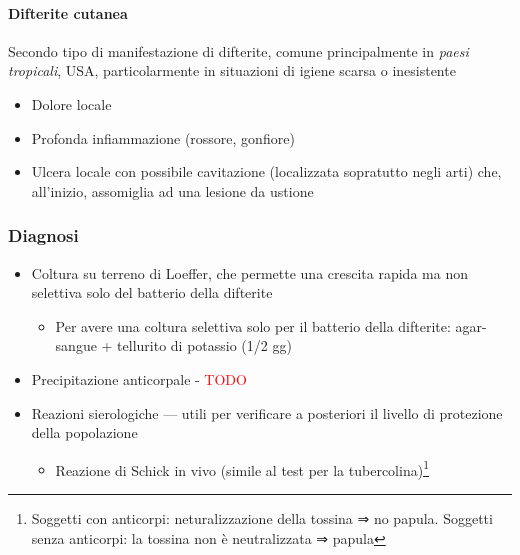 \documentclass[italian,]{article}
\providecommand{\tightlist}{%
  \setlength{\itemsep}{0pt}\setlength{\parskip}{0pt}}
\newcommand{\asidefigure}[2]{\marginpar{\phantom{Img:}\newline\texttt{[image: \#1]}\\\footnotesize\emph{#2}}}
\newcommand{\TODO}[1]{\textcolor{red}{\textsf{\footnotesize{TODO #1}}}} %
\begin{document}
\hypertarget{difterite-cutanea}{%
\paragraph{Difterite cutanea}\label{difterite-cutanea}}

\footnotesize

Secondo tipo di manifestazione di difterite, comune principalmente in
\emph{paesi tropicali}, USA, particolarmente in situazioni di igiene
scarsa o inesistente \normalsize

\begin{itemize}
\tightlist
\item
  Dolore locale
\item
  Profonda infiammazione (rossore, gonfiore)
\item
  Ulcera locale con possibile cavitazione (localizzata sopratutto negli
  arti) che, all'inizio, assomiglia ad una lesione da ustione
  \asidefigure{img/difterite-cutanea.png}{}
\end{itemize}

\hypertarget{diagnosi-6}{%
\subsubsection{Diagnosi}\label{diagnosi-6}}

\begin{itemize}
\tightlist
\item
  Coltura su terreno di Loeffer, che permette una crescita rapida ma non
  selettiva solo del batterio della difterite

  \begin{itemize}
  \tightlist
  \item
    Per avere una coltura selettiva solo per il batterio della
    difterite: agar-sangue + tellurito di potassio (1/2 gg)
  \end{itemize}
\item
  Precipitazione anticorpale - \TODO{}
\item
  Reazioni sierologiche --- utili per verificare a posteriori il livello
  di protezione della popolazione

  \begin{itemize}
  \tightlist
  \item
    Reazione di Schick in vivo (simile al test per la
    tubercolina)\footnote{Soggetti con anticorpi: neturalizzazione della
      tossina ⇒ no papula. Soggetti senza anticorpi: la tossina non è
      neutralizzata ⇒ papula}
  \end{itemize}
\end{itemize}
\end{document}
